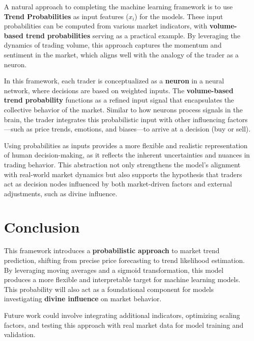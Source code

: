 \documentclass[a4]{article}
\newcommand{\bn}{\bigskip\noindent}
\begin{document}
A natural approach to completing the machine learning framework is to use {\bf Trend Probabilities}  as input features ($x_i$) for the models. These input probabilities can be computed from various market indicators, with {\bf volume-based trend probabilities}  serving as a practical example. By leveraging the dynamics of trading volume, this approach captures the momentum and sentiment in the market, which aligns well with the analogy of the trader as a neuron.

\bn
In this framework, each trader is conceptualized as a {\bf neuron}  in a neural network, where decisions are based on weighted inputs. The {\bf volume-based trend probability}  functions as a refined input signal that encapsulates the collective behavior of the market. Similar to how neurons process signals in the brain, the trader integrates this probabilistic input with other influencing factors---such as price trends, emotions, and biases---to arrive at a decision (buy or sell). 

\bn
Using probabilities as inputs provides a more flexible and realistic representation of human decision-making, as it reflects the inherent uncertainties and nuances in trading behavior. This abstraction not only strengthens the model's alignment with real-world market dynamics but also supports the hypothesis that traders act as decision nodes influenced by both market-driven factors and external adjustments, such as divine influence.

\section{Conclusion}

This framework introduces a {\bf probabilistic approach}  to market trend prediction, shifting from precise price forecasting to trend likelihood estimation. By leveraging moving averages and a sigmoid transformation, this model produces a more flexible and interpretable target for machine learning models. This probability will also act as a foundational component for models investigating {\bf divine influence}  on market behavior.

\bn
Future work could involve integrating additional indicators, optimizing scaling factors, and testing this approach with real market data for model training and validation.
\end{document}
